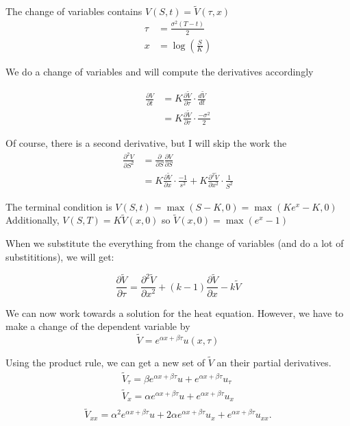 \documentclass{article}
\begin{document}

The change of variables contains $V(S,t) = \tilde{V}(\tau, x)$
\begin{align}
    \tau &= \frac{\sigma^2(T-t)}{2} \\
    x &= \log{(\frac{S}{K})}
\end{align}

We do a change of variables and will compute the derivatives accordingly

\begin{align*}
    \frac{\partial V}{\partial t} &= K\frac{\partial \tilde{V}}{\partial \tau}
    \cdot \frac{d\tilde{V}}{dt} \\
    &= K\frac{\partial \tilde{V}}{\partial \tau} \cdot \frac{-\sigma^2}{2}
\end{align*}

Of course, there is a second derivative, but I will skip the work the 
\begin{align*}
    \frac{\partial^2 V}{\partial S^2} &= \frac{\partial }{\partial S} \frac{\partial V}{\partial S} \\
    &= K \frac{\partial \tilde{V}}{\partial x} \cdot \frac{-1}{s^2} + K \frac{\partial^2 \tilde{V}}{\partial x^2} \cdot \frac{1}{S^2}
\end{align*}

The terminal condition is $V(S,t) = \max{(S-K, 0) = \max{(Ke^x - K, 0)}}$
Additionally, 
$V(S,T) = K\tilde{V}(x,0)$ so $\tilde{V}(x,0) = \max{(e^x -1)}$

When we substitute the everything from the change of variables (and do a lot of substititions), we will get:

\begin{equation}
    \frac{\partial \tilde{V}}{\partial \tau} = \frac{\partial^2 \tilde{V}}{\partial x^2} + (k-1)\frac{\partial \tilde{V}}{\partial x} - k\tilde{V}
\end{equation}

We can now work towards a solution for the heat equation. However, we have to make a change of the dependent variable by
\begin{equation}
    \tilde{V} = e^{\alpha x + \beta \tau} u(x,\tau)
\end{equation}

Using the product rule, we can get a new set of $\tilde{V}$ an their partial derivatives.
\begin{align}
    \tilde{V}_{\tau} = \beta e^{\alpha x + \beta \tau} u + e^{\alpha x + \beta \tau} u_{\tau} \\
    \tilde{V}_{x} = \alpha e^{\alpha x + \beta \tau} u + e^{\alpha x + \beta \tau} u_{x} \\
\end{align}
\begin{equation}
    \tilde{V}_{xx} = \alpha^2 e^{\alpha x + \beta \tau} u + 2\alpha e^{\alpha x + \beta \tau} u_{x} + e^{\alpha x + \beta \tau} u_{xx}. 
\end{equation}
\end{document}
